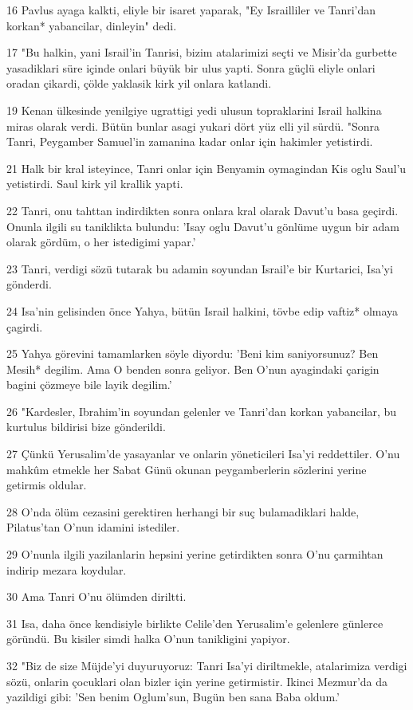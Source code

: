 \par 16 Pavlus ayaga kalkti, eliyle bir isaret yaparak, "Ey Israilliler ve Tanri'dan korkan* yabancilar, dinleyin" dedi.
\par 17 "Bu halkin, yani Israil'in Tanrisi, bizim atalarimizi seçti ve Misir'da gurbette yasadiklari süre içinde onlari büyük bir ulus yapti. Sonra güçlü eliyle onlari oradan çikardi, çölde yaklasik kirk yil onlara katlandi.
\par 19 Kenan ülkesinde yenilgiye ugrattigi yedi ulusun topraklarini Israil halkina miras olarak verdi. Bütün bunlar asagi yukari dört yüz elli yil sürdü. "Sonra Tanri, Peygamber Samuel'in zamanina kadar onlar için hakimler yetistirdi.
\par 21 Halk bir kral isteyince, Tanri onlar için Benyamin oymagindan Kis oglu Saul'u yetistirdi. Saul kirk yil krallik yapti.
\par 22 Tanri, onu tahttan indirdikten sonra onlara kral olarak Davut'u basa geçirdi. Onunla ilgili su taniklikta bulundu: 'Isay oglu Davut'u gönlüme uygun bir adam olarak gördüm, o her istedigimi yapar.'
\par 23 Tanri, verdigi sözü tutarak bu adamin soyundan Israil'e bir Kurtarici, Isa'yi gönderdi.
\par 24 Isa'nin gelisinden önce Yahya, bütün Israil halkini, tövbe edip vaftiz* olmaya çagirdi.
\par 25 Yahya görevini tamamlarken söyle diyordu: 'Beni kim saniyorsunuz? Ben Mesih* degilim. Ama O benden sonra geliyor. Ben O'nun ayagindaki çarigin bagini çözmeye bile layik degilim.'
\par 26 "Kardesler, Ibrahim'in soyundan gelenler ve Tanri'dan korkan yabancilar, bu kurtulus bildirisi bize gönderildi.
\par 27 Çünkü Yerusalim'de yasayanlar ve onlarin yöneticileri Isa'yi reddettiler. O'nu mahkûm etmekle her Sabat Günü okunan peygamberlerin sözlerini yerine getirmis oldular.
\par 28 O'nda ölüm cezasini gerektiren herhangi bir suç bulamadiklari halde, Pilatus'tan O'nun idamini istediler.
\par 29 O'nunla ilgili yazilanlarin hepsini yerine getirdikten sonra O'nu çarmihtan indirip mezara koydular.
\par 30 Ama Tanri O'nu ölümden diriltti.
\par 31 Isa, daha önce kendisiyle birlikte Celile'den Yerusalim'e gelenlere günlerce göründü. Bu kisiler simdi halka O'nun tanikligini yapiyor.
\par 32 "Biz de size Müjde'yi duyuruyoruz: Tanri Isa'yi diriltmekle, atalarimiza verdigi sözü, onlarin çocuklari olan bizler için yerine getirmistir. Ikinci Mezmur'da da yazildigi gibi: 'Sen benim Oglum'sun, Bugün ben sana Baba oldum.'
